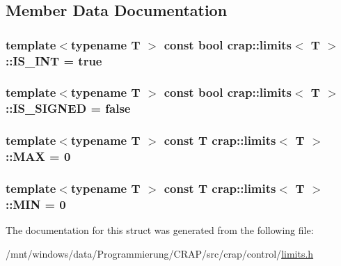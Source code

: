 \subsection{Member Data Documentation}
\hypertarget{structcrap_1_1limits_a2e4a49dbaed009a912dece7de56da35e}{
\subsubsection[{I\-S\-\_\-\-I\-N\-T}]{\setlength{\rightskip}{0pt plus 5cm}template$<$typename T $>$ const bool {\bf crap\-::limits}$<$ T $>$\-::I\-S\-\_\-\-I\-N\-T = true\hspace{0.3cm}{\ttfamily [static]}}}\label{structcrap_1_1limits_a2e4a49dbaed009a912dece7de56da35e}
\hypertarget{structcrap_1_1limits_a1a2b5a6b5063ca03900e9c1955db561b}{
\subsubsection[{I\-S\-\_\-\-S\-I\-G\-N\-E\-D}]{\setlength{\rightskip}{0pt plus 5cm}template$<$typename T $>$ const bool {\bf crap\-::limits}$<$ T $>$\-::I\-S\-\_\-\-S\-I\-G\-N\-E\-D = false\hspace{0.3cm}{\ttfamily [static]}}}\label{structcrap_1_1limits_a1a2b5a6b5063ca03900e9c1955db561b}
\hypertarget{structcrap_1_1limits_a757efc25bd4c43dd068be5ff95331afe}{
\subsubsection[{M\-A\-X}]{\setlength{\rightskip}{0pt plus 5cm}template$<$typename T $>$ const T {\bf crap\-::limits}$<$ T $>$\-::M\-A\-X = 0\hspace{0.3cm}{\ttfamily [static]}}}\label{structcrap_1_1limits_a757efc25bd4c43dd068be5ff95331afe}
\hypertarget{structcrap_1_1limits_a0a11545145a7f4de4432d3956f1a2159}{
\subsubsection[{M\-I\-N}]{\setlength{\rightskip}{0pt plus 5cm}template$<$typename T $>$ const T {\bf crap\-::limits}$<$ T $>$\-::M\-I\-N = 0\hspace{0.3cm}{\ttfamily [static]}}}\label{structcrap_1_1limits_a0a11545145a7f4de4432d3956f1a2159}


The documentation for this struct was generated from the following file\-:\begin{DoxyCompactItemize}
\item 
/mnt/windows/data/\-Programmierung/\-C\-R\-A\-P/src/crap/control/\hyperlink{limits_8h}{limits.\-h}\end{DoxyCompactItemize}
